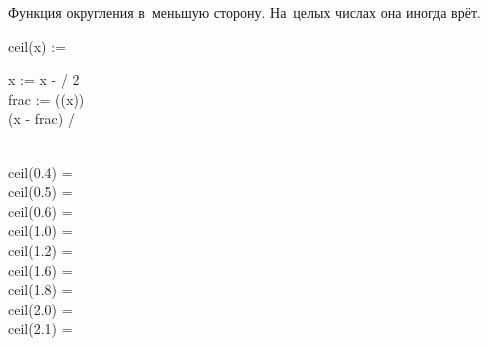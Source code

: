 \documentclass[a4paper, 14pt]{extarticle}
\begin{document}
    Функция округления в~меньшую сторону. На~целых числах она иногда врёт.

    \begin{preproc}

        ceil(x) := \begin{block}
                       x := x \cdot \pi - \pi / 2 \\
                       frac := \arctan(\tan(x)) \\
                       (x - frac) / \pi
        \end{block} \\

        ceil(0.4) = \placeholder{} \\
        ceil(0.5) = \placeholder{} \\
        ceil(0.6) = \placeholder{} \\
        ceil(1.0) = \placeholder{} \\
        ceil(1.2) = \placeholder{} \\
        ceil(1.6) = \placeholder{} \\
        ceil(1.8) = \placeholder{} \\
        ceil(2.0) = \placeholder{} \\
        ceil(2.1) = \placeholder{} \\

         {}

    \end{preproc}
\end{document}
